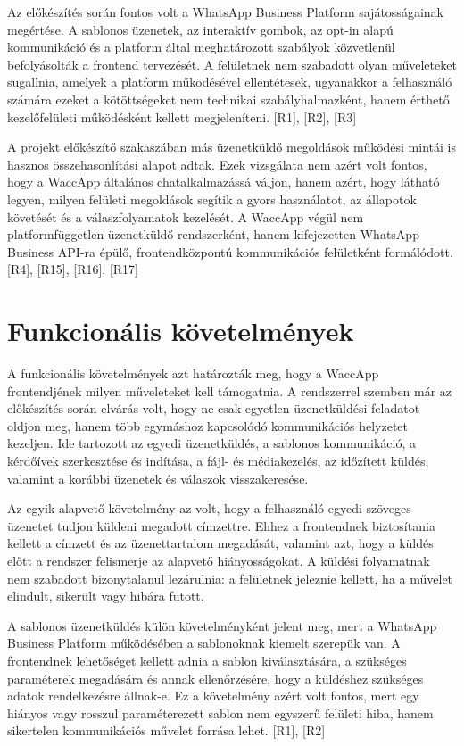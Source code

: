 Az előkészítés során fontos volt a WhatsApp Business Platform sajátosságainak megértése. A sablonos üzenetek, az interaktív gombok, az opt-in alapú kommunikáció és a platform által meghatározott szabályok közvetlenül befolyásolták a frontend tervezését. A felületnek nem szabadott olyan műveleteket sugallnia, amelyek a platform működésével ellentétesek, ugyanakkor a felhasználó számára ezeket a kötöttségeket nem technikai szabályhalmazként, hanem érthető kezelőfelületi működésként kellett megjeleníteni. [R1], [R2], [R3]

A projekt előkészítő szakaszában más üzenetküldő megoldások működési mintái is hasznos összehasonlítási alapot adtak. Ezek vizsgálata nem azért volt fontos, hogy a WaccApp általános chatalkalmazássá váljon, hanem azért, hogy látható legyen, milyen felületi megoldások segítik a gyors használatot, az állapotok követését és a válaszfolyamatok kezelését. A WaccApp végül nem platformfüggetlen üzenetküldő rendszerként, hanem kifejezetten WhatsApp Business API-ra épülő, frontendközpontú kommunikációs felületként formálódott. [R4], [R15], [R16], [R17]

\section{Funkcionális követelmények}

A funkcionális követelmények azt határozták meg, hogy a WaccApp frontendjének milyen műveleteket kell támogatnia. A rendszerrel szemben már az előkészítés során elvárás volt, hogy ne csak egyetlen üzenetküldési feladatot oldjon meg, hanem több egymáshoz kapcsolódó kommunikációs helyzetet kezeljen. Ide tartozott az egyedi üzenetküldés, a sablonos kommunikáció, a kérdőívek szerkesztése és indítása, a fájl- és médiakezelés, az időzített küldés, valamint a korábbi üzenetek és válaszok visszakeresése.

Az egyik alapvető követelmény az volt, hogy a felhasználó egyedi szöveges üzenetet tudjon küldeni megadott címzettre. Ehhez a frontendnek biztosítania kellett a címzett és az üzenettartalom megadását, valamint azt, hogy a küldés előtt a rendszer felismerje az alapvető hiányosságokat. A küldési folyamatnak nem szabadott bizonytalanul lezárulnia: a felületnek jeleznie kellett, ha a művelet elindult, sikerült vagy hibára futott.

A sablonos üzenetküldés külön követelményként jelent meg, mert a WhatsApp Business Platform működésében a sablonoknak kiemelt szerepük van. A frontendnek lehetőséget kellett adnia a sablon kiválasztására, a szükséges paraméterek megadására és annak ellenőrzésére, hogy a küldéshez szükséges adatok rendelkezésre állnak-e. Ez a követelmény azért volt fontos, mert egy hiányos vagy rosszul paraméterezett sablon nem egyszerű felületi hiba, hanem sikertelen kommunikációs művelet forrása lehet. [R1], [R2]

